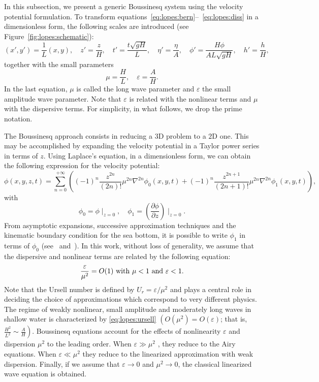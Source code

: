 In this subsection, we present a generic Boussinesq system using the
velocity potential formulation.  To transform
equations~\eqref{eq:lopes:bern}--~\eqref{eq:lopes:diss} in a
dimensionless form, the following scales are introduced (see
Figure~\ref{fig:lopes:schematic}):
\begin{equation}
( x', y')=\frac{1}{L}(x,y),\quad z'=\frac{z}{H}, \quad
t'=\frac{t\sqrt{gH}}{L},\quad \eta'=\frac{\eta}{A},\quad
\phi'= \frac{H\phi}{AL\sqrt{gH}},\quad h'=\frac{h}{H},
\end{equation}
together with the small parameters
\begin{equation}
  \mu=\frac{H}{L},\quad \varepsilon=\frac{A}{H}.
\end{equation}
In the last equation, $\mu$ is called the long wave parameter and
$\varepsilon$ the small amplitude wave parameter.  Note that
$\varepsilon$ is related with the nonlinear terms and $\mu$ with the
dispersive terms.  For simplicity, in what follows, we drop the prime
notation.

The Boussinesq approach consists in reducing a $3$D problem to a $2$D
one.  This may be accomplished by expanding the velocity potential in
a Taylor power series in terms of $z$.  Using Laplace's equation, in a
dimensionless form, we can obtain the following expression for the
velocity potential:
\begin{equation}
\phi(x,y,z,t) = \sum_{n=0}^{+\infty} \left((-1)^n \frac{z^{2n}}{(2n)!}
  \mu^{2n}\nabla^{2n}\phi_0(x,y,t) + (-1)^n \frac{z^{2n+1}}{(2n+1)!}
  \mu^{2n}\nabla^{2n}\phi_1(x,y,t)\right),
\end{equation}
with
\begin{equation}
  \phi_0=\phi\mid_{ z=0},\quad
  \phi_1=\left(\frac{\partial \phi}{\partial z}\right)\mid_{z=0}\!.
\end{equation}
From asymptotic expansions, successive approximation techniques and
the kinematic boundary condition for the sea bottom, it is possible to
write $\phi_1$ in terms of $\phi_0$ (see~\citet{ChenLiu1994}
and~\citet{ZhaoTengCheng2004}).  In this work, without loss of
generality, we assume that the dispersive and nonlinear terms are
related by the following equation:
\begin{equation}
  \label{eq:lopes:ursell}
  \frac{\varepsilon}{\mu^2}=O(1)\ {\rm with}\ \mu<1\ {\rm
    and}\ \varepsilon<1.
\end{equation}
Note that the Ursell number is defined by
$U_r = \varepsilon/\mu^2$ and plays a central role in deciding
the choice of approximations which correspond to very different
physics.  The regime of weakly nonlinear, small amplitude and
moderately long waves in shallow water is characterized by
\eqref{eq:lopes:ursell} $\left(O(\mu^2)=O(\varepsilon)\right.$; that
is, $\left.\frac{H^2}{L^2}\sim\frac{A}{H} \right)$. Boussinesq
equations account for the effects of nonlinearity $\varepsilon$ and
dispersion $\mu^2$ to the leading order.  When $\varepsilon\gg \mu^2$
, they reduce to the Airy equations.  When $\varepsilon\ll \mu^2$ they
reduce to the linearized approximation with weak dispersion.  Finally,
if we assume that $\varepsilon\rightarrow 0$ and $\mu^2\rightarrow 0$,
the classical linearized wave equation is obtained.

